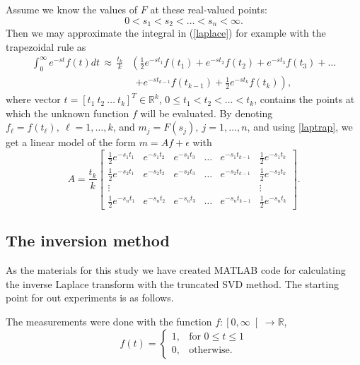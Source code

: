 \documentclass[12pt,a4]{article}
\newcommand{\R}{{\mathbb R}}
\newcommand{\ra}{\rightarrow}
\begin{document}
Assume we know the values of $F$ at these real-valued points:
$$
 0<s_1<s_2<\ldots <s_n<\infty.
$$ 
Then we may approximate the integral in (\ref{laplace}) for example with the trapezoidal rule as
\begin{equation} \label{laptrap}
\begin{split}
 \int_0^\infty e^{-st}f(t)dt\, \approx\, \frac{t_k}{k} & \left( \frac{1}{2}e^{-st_1}f(t_1)+e^{-st_2}f(t_2)+e^{-st_3}f(t_3)+\ldots\right.\\   &\ \ \left. +e^{-st_{k-1}}f(t_{k-1})+\frac{1}{2}e^{-st_k}f(t_k)\right) ,
\end{split}
\end{equation}
where vector $t=[t_1\ t_2\ \ldots\ t_k]^T\in\R^k$, $0\leq t_1<t_2<\ldots <t_k$, contains the points at which the unknown function $f$ will be evaluated. By denoting $f_\ell=f(t_\ell), \ \ell=1,\ldots ,k$, and $m_j=F(s_j),\ j=1,\ldots ,n$, and using \eqref{laptrap}, we get a linear model of the form $m=Af+\epsilon$ with
\begin{equation}\label{LaplaceA} 
A = \frac{t_k}{k}\begin{bmatrix} \frac{1}{2}e^{-s_1t_1} & e^{-s_1t_2} & e^{-s_1t_3} & \ldots & e^{-s_1t_{k-1}} & \frac{1}{2}e^{-s_1t_k} \\
                       \frac{1}{2}e^{-s_2t_1} & e^{-s_2t_2} & e^{-s_2t_3} & \ldots & e^{-s_2t_{k-1}} & \frac{1}{2}e^{-s_2t_k} \\
                       \vdots & & & & & \vdots \\
                       \frac{1}{2}e^{-s_nt_1} & e^{-s_nt_2} & e^{-s_nt_3} & \ldots & e^{-s_nt_{k-1}} & \frac{1}{2}e^{-s_nt_k} \end{bmatrix}.
\end{equation}


\subsection{The inversion method}

As the materials for this study we have created MATLAB code for calculating the inverse Laplace transform with the truncated SVD method. The starting point for out experiments is as follows.

The measurements were done with the function $f: \left[ 0, \infty \right[ \ra \R$,
\begin{equation}\label{eq:f}
f(t) = 
\begin{cases}
1, & \text{for } 0 \leq t \leq 1 \\
0, & \text{otherwise}.
\end{cases}
\end{equation}
\end{document}
